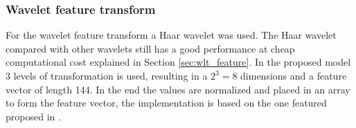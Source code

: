 \subsubsection{Wavelet feature transform}
\label{sec:meth:featextr:wt}
For the wavelet feature transform a Haar wavelet was used. The Haar wavelet compared with other wavelets still has a good performance at cheap computational cost explained in Section \ref{sec:wlt_feature}. In the proposed model 3 levels of transformation is used, resulting in a $2^3 = 8$ dimensions and a feature vector of length 144. In the end the values are normalized and placed in an array to form the feature vector, the implementation is based on the one featured proposed in \cite{wang2015new}.
